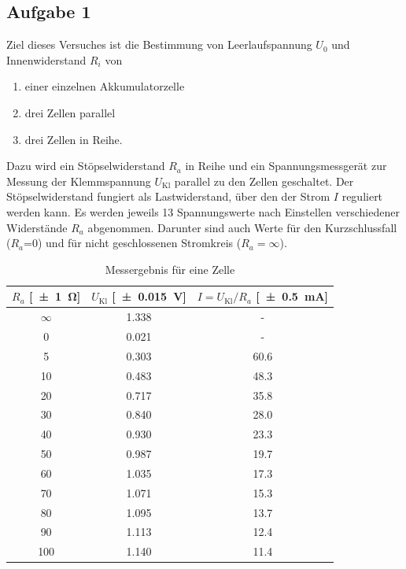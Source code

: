 \subsection{Aufgabe 1}
Ziel dieses Versuches ist die Bestimmung von Leerlaufspannung $U_0$ und Innenwiderstand $R_i$ von
\begin{enumerate}
  \item einer einzelnen Akkumulatorzelle
  \item drei Zellen parallel
  \item drei Zellen in Reihe.
\end{enumerate}
Dazu wird ein Stöpselwiderstand $R_a$ in Reihe und ein Spannungsmessgerät zur Messung der Klemmspannung $U_{\text{Kl}}$ parallel zu den Zellen geschaltet. Der Stöpselwiderstand fungiert als Lastwiderstand, über den der Strom $I$ reguliert werden kann. Es werden jeweils 13 Spannungswerte nach Einstellen verschiedener Widerstände $R_a$ abgenommen. Darunter sind auch Werte für den Kurzschlussfall ($R_a$=0) und für nicht geschlossenen Stromkreis ($R_a=\infty$).
\begin{table}[H]
  \centering
  \begin{tabular}{c c c} \toprule
    $R_a$ [\SI{\pm1}{\ohm}] & $U_{\text{Kl}}$ [\SI{\pm .015}{V}] & $I=U_{\text{Kl}}/R_a$ [\SI{\pm .5}{mA}] \\ \midrule
    $\infty$ & \num{1.338} & - \\
    0 & \num{0.021} & - \\
    5 & \num{0.303} & \num{60.6} \\
    10 & \num{.483} & \num{48.3} \\
    20 & \num{.717} & \num{35.8} \\
    30 & \num{.840} & \num{28.0} \\
    40 & \num{.930} & \num{23.3} \\
    50 & \num{.987} & \num{19.7} \\
    60 & \num{1.035} & \num{17.3} \\
    70 & \num{1.071} & \num{15.3} \\
    80 & \num{1.095} & \num{13.7} \\
    90 & \num{1.113} & \num{12.4} \\
    100 & \num{1.140} & \num{11.4} \\ \bottomrule
  \end{tabular}
  \caption{Messergebnis für eine Zelle}
  \label{tab:einezelle}
\end{table}

